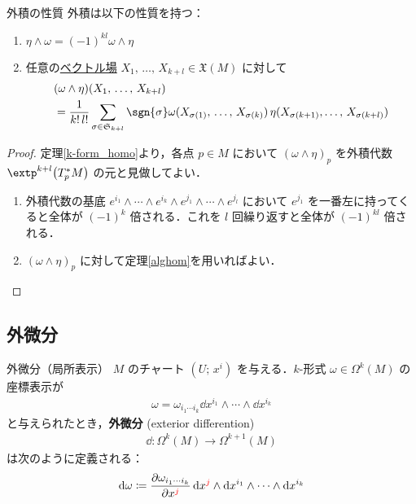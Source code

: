\documentclass[geometry_main]{subfiles}
\begin{document}
\begin{myprop}[label=extp_1]{外積の性質}
	外積は以下の性質を持つ：
	\begin{enumerate} 
		\item $\eta \wedge \omega = (-1)^{kl} \omega \wedge \eta$
		\item 任意の\underline{ベクトル場} $X_1,\, \dots ,\, X_{k+l} \in \mathfrak{X}(M)$ に対して
		\begin{align} 
			&(\omega \wedge \eta)(X_1,\, \dots ,\, X_{k+l}) \\
			&= \frac{1}{k !\, l !} \sum_{\sigma \in \mathfrak{S}_{k+l}} \sgn{\sigma} \omega(X_{\sigma(1)},\, \dots ,\, X_{\sigma(k)})\, \eta(X_{\sigma(k+1)},\dots ,\, X_{\sigma(k+l)})
		\end{align}
	\end{enumerate}
\end{myprop}

\begin{proof} 
	定理\ref{k-form_homo}より，各点 $p \in M$ において $(\omega \wedge \eta)_p$ を外積代数 $\extp^{k+l}\bigl(T^*_pM\bigr)$ の元と見做してよい．
	\begin{enumerate} 
		\item 外積代数の基底 $e^{i_1} \wedge \cdots \wedge e^{i_k} \wedge e^{j_1} \wedge \cdots \wedge e^{j_l}$ において $e^{j_1}$ を一番左に持ってくると全体が $(-1)^k$ 倍される．これを $l$ 回繰り返すと全体が $(-1)^{kl}$ 倍される．
		\item $(\omega \wedge \eta)_p$ に対して定理\ref{alghom}を用いればよい．
	\end{enumerate}
\end{proof}


\subsection{外微分}

\begin{mydef}[label=extdiff_1]{外微分（局所表示）} 
	$M$ のチャート $(U;\, x^i)$ を与える．$k$-形式 $\omega \in \Omega^k(M)$ の座標表示が
	\begin{align} 
		\omega = \omega_{i_1 \cdots i_k} \dd{x^{i_1}} \wedge \cdots \wedge \dd{x^{i_k}} 
	\end{align}
	と与えられたとき，\textbf{外微分} (exterior differention) 
	\begin{align} 
		\dd{} \colon \Omega^k(M) \to \Omega^{k+1}(M)
	\end{align}
	は次のように定義される：
	\begin{align} 
		\dd{\omega} \coloneqq \pdv{\omega_{i_1 \cdots i_k}}{x^{\textcolor{red}{j}}} \dd{x^{\textcolor{red}{j}}} \wedge \dd{x^{i_1}} \wedge \cdots \wedge \dd{x^{i_k}} 
	\end{align}
\end{mydef}
\end{document}
